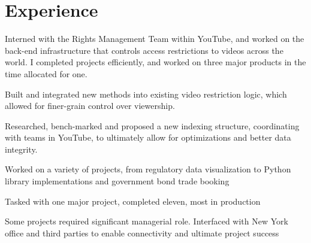 \documentclass[letterpaper]{deedy-resume}
\begin{document}
  \begin{minipage}[t]{0.66\textwidth}
    \section{Experience}
        \vspace{10pt}

        \begin{tightitemize}
          \item Interned with the Rights Management Team within YouTube,
            and worked on the back-end infrastructure that controls access
            restrictions to videos across the world. I completed projects
            efficiently, and worked on three major products in the time
            allocated for one.
          \item Built and integrated new methods into existing video restriction
            logic, which allowed for finer-grain control over viewership.
          \item Researched, bench-marked and proposed a new indexing structure,
            coordinating with  teams in YouTube, to ultimately allow for
            optimizations and better data integrity.
        \end{tightitemize}

        \vspace{2pt}

        \begin{tightitemize}
          \item Worked on a variety of projects, from regulatory data
            visualization to Python library implementations and government bond
            trade booking
          \item Tasked with one major project, completed eleven, most in
            production
          \item Some projects required significant managerial role. Interfaced
            with New York office and third parties to enable connectivity and
            ultimate project success
        \end{tightitemize}



\end{minipage}
\end{document}
